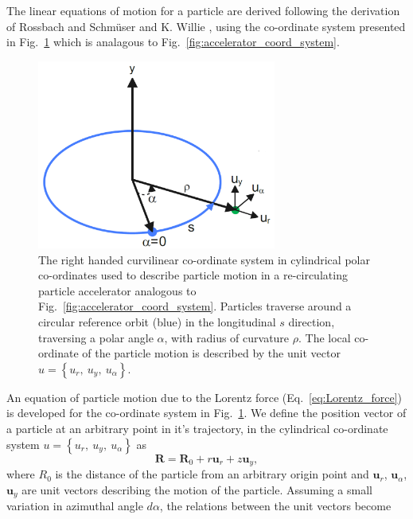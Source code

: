 \documentclass[../main.tex]{subfiles}
\begin{document}
The linear equations of motion for a particle are derived following the derivation of Rossbach and Schm\"{u}ser \cite{rossbach1993basic} and K. Willie \cite{wille2000physics}, using the co-ordinate system presented in Fig.~\ref{fig:polar_coord_system} which is analagous to Fig.~\ref{fig:accelerator_coord_system}.
\begin{figure}[!h]
\centering
\includegraphics[width=0.7\textwidth]{Figures/Energy_Recovery_Linac_Design/polar_coord_system_fixed.pdf}
\caption{The right handed curvilinear co-ordinate system in cylindrical polar co-ordinates used to describe particle motion in a re-circulating particle accelerator analogous to Fig.~\ref{fig:accelerator_coord_system}. Particles traverse around a circular reference orbit (blue) in the longitudinal $s$ direction, traversing a polar angle $\alpha$, with radius of curvature $\rho$. The local co-ordinate of the particle motion is described by the unit vector $u = \left\{u_{r},~u_{y},~u_{\alpha}\right\}$.}
\label{fig:polar_coord_system}
\end{figure}
An equation of particle motion due to the Lorentz force (Eq.~\ref{eq:Lorentz_force}) is developed for the co-ordinate system in Fig.~\ref{fig:polar_coord_system}. We define the position vector of a particle at an arbitrary point in it's trajectory, in the cylindrical co-ordinate system $u=\left\{u_{r},~u_{y},~u_{\alpha}\right\}$ as
\begin{equation}
\boldsymbol{R} = \boldsymbol{R}_{0} + r\boldsymbol{u}_{r} + z\boldsymbol{u}_{y},    
\label{eq:particle_position_vector}
\end{equation}
where $R_{0}$ is the distance of the particle from an arbitrary origin point and $\boldsymbol{u}_{r}$, $\boldsymbol{u}_{\alpha}$, $\boldsymbol{u}_{y}$ are unit vectors describing the motion of the particle. Assuming a small variation in azimuthal angle $d\alpha$, the relations between the unit vectors become
\end{document}
